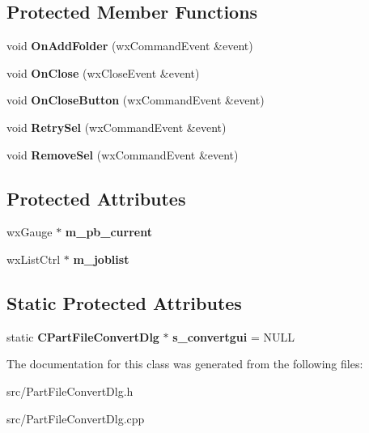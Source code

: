 \subsection*{Protected Member Functions}
\begin{DoxyCompactItemize}
\item 
void {\bfseries OnAddFolder} (wxCommandEvent \&event)\label{classCPartFileConvertDlg_a14970638f601ff895c716ce239ba8f17}

\item 
void {\bfseries OnClose} (wxCloseEvent \&event)\label{classCPartFileConvertDlg_a47c0cb2ab21426ecb6e593ed402fd0fb}

\item 
void {\bfseries OnCloseButton} (wxCommandEvent \&event)\label{classCPartFileConvertDlg_a73df2aa744739e55e90df0db31d395bb}

\item 
void {\bfseries RetrySel} (wxCommandEvent \&event)\label{classCPartFileConvertDlg_afc809b556f9952d4c7ea89fd35c1d284}

\item 
void {\bfseries RemoveSel} (wxCommandEvent \&event)\label{classCPartFileConvertDlg_ab39da9989ddcb0ce3b462d429ada7f64}

\end{DoxyCompactItemize}
\subsection*{Protected Attributes}
\begin{DoxyCompactItemize}
\item 
wxGauge $\ast$ {\bfseries m\_\-pb\_\-current}\label{classCPartFileConvertDlg_a7389f99c9801d7c9e046d798f69f6b81}

\item 
wxListCtrl $\ast$ {\bfseries m\_\-joblist}\label{classCPartFileConvertDlg_a181054cf142621737e53ef810e14a0ec}

\end{DoxyCompactItemize}
\subsection*{Static Protected Attributes}
\begin{DoxyCompactItemize}
\item 
static {\bf CPartFileConvertDlg} $\ast$ {\bfseries s\_\-convertgui} = NULL\label{classCPartFileConvertDlg_a3fe33f34e6bbe5a5850a6957e4e3f9c3}

\end{DoxyCompactItemize}


The documentation for this class was generated from the following files:\begin{DoxyCompactItemize}
\item 
src/PartFileConvertDlg.h\item 
src/PartFileConvertDlg.cpp\end{DoxyCompactItemize}
